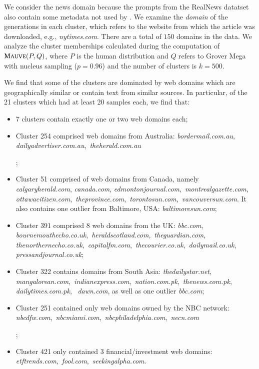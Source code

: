 \documentclass{article}
\theoremstyle{definition}
\newcommand{\name}{{\fontfamily{bch}\selectfont{\textsc{Mauve}}}\xspace}
\begin{document}
We consider the news domain because the prompts from the RealNews datatset~\cite{zellers2019grover} also contain some metadata not used by \name.
We examine the {\em domain} of the generations in each cluster, which refers to the website from which the article was downloaded, e.g., \textit{nytimes.com}. There are a total of $150$ domains in the data. 
We analyze the cluster memberships calculated during the computation of $\name(P, Q)$, where $P$ is the human distribution and $Q$ refers to Grover Mega with nucleus sampling ($p=0.96$) and the number of clusters is $k=500$. 


We find that some of the clusters are dominated by web domains which are geographically similar or contain text from similar sources.
In particular, of the 21 clusters which had at least 20 samples each, we find that:
\begin{itemize}
    \item 7 clusters contain exactly one or two web domains each;
    \item \parbox[t]{\dimexpr\linewidth-\leftmargin\relax}{Cluster 254 comprised web domains from Australia: \textit{bordermail.com.au},\, \textit{dailyadvertiser.com.au},\, \textit{theherald.com.au}};
    \item \parbox[t]{\dimexpr\linewidth-\leftmargin\relax}{
    Cluster 51 comprised of web domains from Canada, namely \textit{calgaryherald.com}, \textit{canada.com}, \textit{edmontonjournal.com},\, \textit{montrealgazette.com},\, \textit{ottawacitizen.com},\, \textit{theprovince.com},\, \textit{torontosun.com},\, \textit{vancouversun.com}.
    It also contains one outlier from Baltimore, USA: \textit{baltimoresun.com}; }
    \item \parbox[t]{\dimexpr\linewidth-\leftmargin\relax}{
    Cluster 391 comprised 8 web domains from the UK:
    \textit{bbc.com},\,
    \textit{bournemouthecho.co.uk},\, \textit{heraldscotland.com},\, \textit{theguardian.com},\, \textit{thenorthernecho.co.uk},\, \textit{capitalfm.com},\, \textit{thecourier.co.uk},\, \textit{dailymail.co.uk},\, \textit{pressandjournal.co.uk};}
    \item \parbox[t]{\dimexpr\linewidth-\leftmargin\relax}{
    Cluster 322 contains domains from South Asia: 
    \textit{thedailystar.net},\,
    \textit{mangalorean.com},\, \textit{indianexpress.com},\,
    \textit{nation.com.pk},\, \textit{thenews.com.pk},\, \textit{dailytimes.com.pk},  \,
    \textit{dawn.com},
    as well as one outlier \textit{bbc.com};}
    \item \parbox[t]{\dimexpr\linewidth-\leftmargin\relax}{
    Cluster 251 contained only web domains owned by the NBC network: \textit{nbcdfw.com},\, \textit{nbcmiami.com},\, \textit{nbcphiladelphia.com},\, \textit{necn.com}};
    \item \parbox[t]{\dimexpr\linewidth-\leftmargin\relax}{
    Cluster 421 only contained 3 financial/investment web domains: \textit{etftrends.com},\, \textit{fool.com},\, \textit{seekingalpha.com}.}
\end{itemize}
\end{document}
